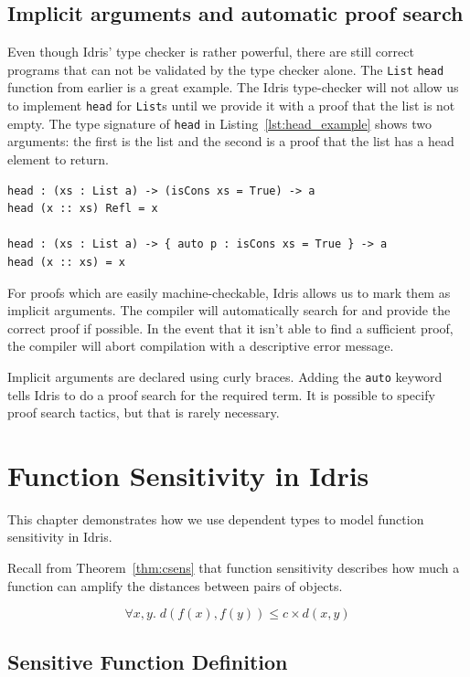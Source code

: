 \documentclass[12pt]{report}
\begin{document}
\section{Implicit arguments and automatic proof search}

Even though Idris' type checker is rather powerful, there are still correct programs that can not be validated by the type checker alone.
The \texttt{List} \lstinline{head} function from earlier is a great example.
The Idris type-checker will not allow us to implement \texttt{head} for \texttt{List}s until we provide it with a proof that the list is not empty.
The type signature of \texttt{head} in Listing~\ref{lst:head_example} shows two arguments: the first is the list and the second is a proof that the list has a head element to return.

\begin{lstlisting}[caption={Taking the head of a list},label={lst:head_example}]
head : (xs : List a) -> (isCons xs = True) -> a
head (x :: xs) Refl = x

head : (xs : List a) -> { auto p : isCons xs = True } -> a
head (x :: xs) = x
\end{lstlisting}

For proofs which are easily machine-checkable, Idris allows us to mark them as implicit arguments.
The compiler will automatically search for and provide the correct proof if possible.
In the event that it isn't able to find a sufficient proof, the compiler will abort compilation with a descriptive error message.

Implicit arguments are declared using curly braces.
Adding the \texttt{auto} keyword tells Idris to do a proof search for the required term.
It is possible to specify proof search tactics, but that is rarely necessary.

\chapter{Function Sensitivity in Idris}\label{sec:function_sensitivity}

This chapter demonstrates how we use dependent types to model function sensitivity in Idris.

Recall from Theorem~\ref{thm:csens} that function sensitivity describes how much a function can amplify the distances between pairs of objects.

$$ \forall x,y.\; d(f(x),f(y)) \le c \times d(x,y) $$

\section{Sensitive Function Definition}
\end{document}
